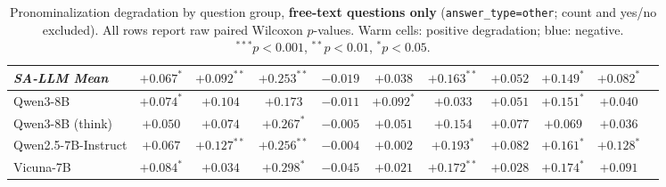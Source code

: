 \begin{table}[h]
\begin{tabular}{lcccccccccc}
\rowcolor{gray!12}\textit{SA-LLM Mean} & \cellcolor{orange!12}$+0.067^{*}$ & \cellcolor{orange!12}$+0.092^{**}$ & \cellcolor{orange!24}$+0.253^{**}$ & $-0.019$ & \cellcolor{orange!12}$+0.038$ & \cellcolor{orange!24}$+0.163^{**}$ & \cellcolor{orange!12}$+0.052$ & \cellcolor{orange!24}$+0.149^{*}$ & \cellcolor{orange!12}$+0.082^{*}$ \\
\midrule
\quad Qwen3-8B & \cellcolor{orange!12}$+0.074^{*}$ & \cellcolor{orange!24}$+0.104$ & \cellcolor{orange!24}$+0.173$ & $-0.011$ & \cellcolor{orange!12}$+0.092^{*}$ & \cellcolor{orange!12}$+0.033$ & \cellcolor{orange!12}$+0.051$ & \cellcolor{orange!24}$+0.151^{*}$ & \cellcolor{orange!12}$+0.040$ \\
\quad Qwen3-8B (think) & \cellcolor{orange!12}$+0.050$ & \cellcolor{orange!12}$+0.074$ & \cellcolor{orange!24}$+0.267^{*}$ & $-0.005$ & \cellcolor{orange!12}$+0.051$ & \cellcolor{orange!24}$+0.154$ & \cellcolor{orange!12}$+0.077$ & \cellcolor{orange!12}$+0.069$ & \cellcolor{orange!12}$+0.036$ \\
\quad Qwen2.5-7B-Instruct & \cellcolor{orange!12}$+0.067$ & \cellcolor{orange!24}$+0.127^{**}$ & \cellcolor{orange!24}$+0.256^{**}$ & $-0.004$ & $+0.002$ & \cellcolor{orange!24}$+0.193^{*}$ & \cellcolor{orange!12}$+0.082$ & \cellcolor{orange!24}$+0.161^{*}$ & \cellcolor{orange!24}$+0.128^{*}$ \\
\quad Vicuna-7B & \cellcolor{orange!12}$+0.084^{*}$ & \cellcolor{orange!12}$+0.034$ & \cellcolor{orange!24}$+0.298^{*}$ & \cellcolor{blue!10}$-0.045$ & \cellcolor{orange!12}$+0.021$ & \cellcolor{orange!24}$+0.172^{**}$ & \cellcolor{orange!12}$+0.028$ & \cellcolor{orange!24}$+0.174^{*}$ & \cellcolor{orange!12}$+0.091$ \\
\bottomrule
\end{tabular}
\caption{Pronominalization degradation by question group, \textbf{free-text questions only} (\texttt{answer\_type=other}; count and yes/no excluded). All rows report raw paired Wilcoxon $p$-values. Warm cells: positive degradation; blue: negative. $^{***}p{<}0.001$, $^{**}p{<}0.01$, $^{*}p{<}0.05$.}
\label{tab:degradation_wilcoxon_ft}
\end{table}
